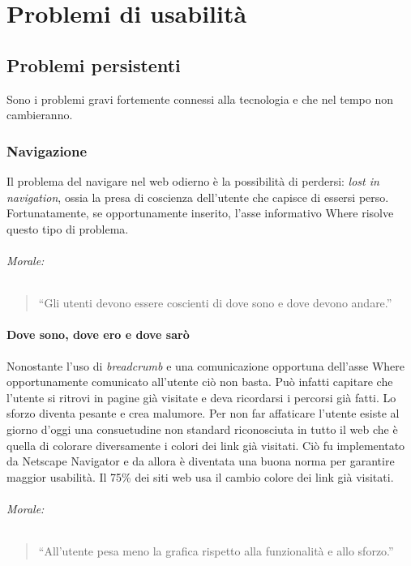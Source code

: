 
\chapter{Problemi di usabilità}

	\section{Problemi persistenti}
		Sono i problemi gravi fortemente connessi alla tecnologia e che nel tempo non cambieranno.
	
		\subsection{Navigazione}
			Il problema del navigare nel web odierno è la possibilità di perdersi: \emph{lost in navigation}, ossia la presa di coscienza dell'utente che capisce di essersi perso. Fortunatamente, se opportunamente inserito, l'asse informativo Where risolve questo tipo di problema.
			\subparagraph*{Morale:}
			\begin{quote}
				``Gli utenti devono essere coscienti di dove sono e dove devono andare.''
			\end{quote}
			
			\subsubsection{Dove sono, dove ero e dove sarò}
				Nonostante l'uso di \emph{breadcrumb} e una comunicazione opportuna dell'asse Where opportunamente comunicato all'utente ciò non basta. Può infatti capitare che l'utente si ritrovi in pagine già visitate e deva ricordarsi i percorsi già fatti. Lo sforzo diventa pesante e crea malumore. Per non far affaticare l'utente esiste al giorno d'oggi una consuetudine non standard riconosciuta in tutto il web che è quella di colorare diversamente i colori dei link già visitati. Ciò fu implementato da Netscape Navigator e da allora è diventata una buona norma per garantire maggior usabilità.
				Il 75\% dei siti web usa il cambio colore dei link già visitati.
			\subparagraph*{Morale:}
			\begin{quote}
				``All'utente pesa meno la grafica rispetto alla funzionalità e allo sforzo.''
			\end{quote}	
			
